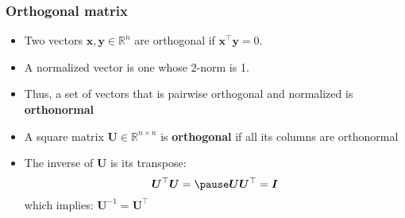 \documentclass[smaller]{beamer}
\newcommand{\?}{\stackrel{?}{=}}
\newcommand{\mb}{\mathbb}
\newcommand{\tr}{^{\top}}
\begin{document}
\begin{frame}
	\frametitle{Orthogonal matrix}
	
	\pause
	
	\begin{itemize}
		\item Two vectors $\bm x,\bm y\in\mb{R}^n$ are orthogonal if $\bm
		x\tr \bm y = 0$. \pause
		
		\item A normalized vector is one whose 2-norm is 1. \pause
		
		\item Thus, a set of vectors that is pairwise orthogonal and
		normalized is \textbf{orthonormal}
		\pause
		\item A square matrix $\bm U\in\mb{R}^{n\times n}$ is
		\textbf{orthogonal} if all its columns are orthonormal
		\pause
		
		\item The inverse of $\bm U$ is its transpose: \pause
		\begin{equation}
			\bm U\tr\bm{U}= \pause \bm U\bm U\tr  = \bm I 
		\end{equation}
		\pause which implies: $\bm U^{-1} = \bm U\tr$
	\end{itemize}
	
	
\end{frame}
\end{document}
